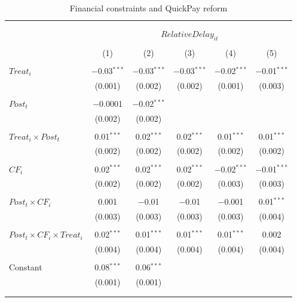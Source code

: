 \documentclass[
]{article}
\begin{document}
\begin{table}[H] \centering 
  \caption{Financial constraints and QuickPay reform} 
  \label{} 
\small 
\begin{tabular}{@{\extracolsep{-2pt}}lccccc} 
\\[-1.8ex]\hline 
\hline \\[-1.8ex] 
\\[-1.8ex] & \multicolumn{5}{c}{$RelativeDelay_{it}$} \\ 
\\[-1.8ex] & (1) & (2) & (3) & (4) & (5)\\ 
\hline \\[-1.8ex] 
 $Treat_i$ & $-$0.03$^{***}$ & $-$0.03$^{***}$ & $-$0.03$^{***}$ & $-$0.02$^{***}$ & $-$0.01$^{***}$ \\ 
  & (0.001) & (0.002) & (0.002) & (0.001) & (0.003) \\ 
  & & & & & \\ 
 $Post_t$ & $-$0.0001 & $-$0.02$^{***}$ &  &  &  \\ 
  & (0.002) & (0.002) &  &  &  \\ 
  & & & & & \\ 
 $Treat_i \times Post_t$ & 0.01$^{***}$ & 0.02$^{***}$ & 0.02$^{***}$ & 0.01$^{***}$ & 0.01$^{***}$ \\ 
  & (0.002) & (0.002) & (0.002) & (0.002) & (0.002) \\ 
  & & & & & \\ 
 $CF_i$ & 0.02$^{***}$ & 0.02$^{***}$ & 0.02$^{***}$ & $-$0.02$^{***}$ & $-$0.01$^{***}$ \\ 
  & (0.002) & (0.002) & (0.002) & (0.003) & (0.003) \\ 
  & & & & & \\ 
 $Post_t \times CF_i$ & 0.001 & $-$0.01 & $-$0.01 & $-$0.001 & 0.01$^{***}$ \\ 
  & (0.003) & (0.003) & (0.003) & (0.003) & (0.004) \\ 
  & & & & & \\ 
 $Post_t \times CF_i \times Treat_i$ & 0.02$^{***}$ & 0.01$^{***}$ & 0.01$^{***}$ & 0.01$^{***}$ & 0.002 \\ 
  & (0.004) & (0.004) & (0.004) & (0.004) & (0.004) \\ 
  & & & & & \\ 
 Constant & 0.08$^{***}$ & 0.06$^{***}$ &  &  &  \\ 
  & (0.001) & (0.001) &  &  &  \\ 
  & & & & & \\ 
\hline \\[-1.8ex] 

\end{tabular}
\end{table}
\end{document}
